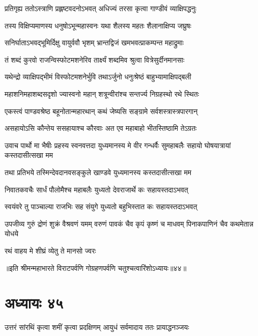 \twolineshloka
{प्रतिगृह्य ततोऽस्त्राणि प्रह्लष्टवदनोऽभवत्}
{अधिज्यं तरसा कृत्वा गाण्डीवं व्याक्षिपद्धनुः}


\twolineshloka
{तस्य विक्षिप्यमाणस्य धनुषोऽभून्महास्वनः}
{यथा शैलस्य महतः शैलानाक्षिप्य जघ्रुषः}


\twolineshloka
{सनिर्घाताऽभवद्भूमिर्दिक्षु वायुर्ववौ भृशम्}
{भ्रान्तद्विजं खमभवत्प्राकम्पन्त महाद्रुमाः}


\twolineshloka
{तं शब्दं कुरवो राजन्विस्फोटमशनेरिव}
{तार्क्ष्यं शब्दमिव श्रुत्वा वित्रेसुर्दीनमानसाः}


\twolineshloka
{यथेन्द्रो व्याक्षिपद्भीमं विस्फोटमशनेर्भुवि}
{तथाऽर्जुनो धनुःश्रेष्ठं बाहुभ्यामाक्षिपद्बली}


\twolineshloka
{महाशनिमहाशब्दसदृशो ज्यास्वनो महान्}
{शत्रून्वीरांश्च सन्तर्ज्य निग्रहस्थो रथे स्थितः}




\twolineshloka
{एकस्त्वं पाण्डवश्रेष्ठ बहूनोतान्महारथान्}
{कथं जेष्यसि सङ्ग्रामे सर्वशस्त्रास्त्रपारगान्}


\twolineshloka
{असहायोऽसि कौन्तेय ससहायाश्च कौरवाः}
{अत एव महाबाहो भीतस्तिष्ठामि तेऽग्रतः}



\onelineshloka
{उवाच पार्थो मा भैषीः प्रहस्य स्वनवत्तदा}
\twolineshloka
{युध्यमानस्य मे वीर गन्धर्वैः सुमहाबलैः}
{सहायो घोषयात्रायां कस्तदासीत्सखा मम}


\twolineshloka
{तथा प्रतिभये तस्मिन्देवदानवसङ्कुले}
{खाण्डवे युध्यमानस्य कस्तदासीत्सखा मम}


\twolineshloka
{निवातकवचैः सार्धं पौलोमैश्च महाबलैः}
{युध्यतो देवराजार्थे कः सहायस्तदाऽभवत्}


\twolineshloka
{स्वयंवरे तु पाञ्चाल्या राजभिः सह संयुगे}
{युध्यतो बहुभिस्तात कः सहायस्तदाऽभवत्}


\threelineshloka
{उपजीव्य गुरुं द्रोणं शुक्रं वैश्रवणं यमम्}
{वरुणं पावकं चैव कृपं कृष्णं च माधवम्}
{पिनाकपाणिनं चैव कथमेतान्न योधये}


\onelineshloka
{रथं वाहय मे शीघ्रं व्येतु ते मानसो ज्वरः}


॥इति श्रीमन्महाभारते विराटपर्वणि गोग्रहणपर्वणि चतुश्चत्वारिंशोऽध्यायः॥४४॥

\chapter{अध्यायः ४५}

\twolineshloka
{उत्तरं सांरथिं कृत्वा शमीं कृत्वा प्रदक्षिणम्}
{आयुधं सर्वमादाय ततः प्रायाद्धनञ्जयः}


